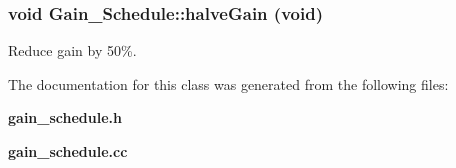 \subsubsection{\setlength{\rightskip}{0pt plus 5cm}void Gain\_\-Schedule::halve\-Gain (void)\hspace{0.3cm}{\tt  [inline]}}\label{classGain__Schedule_5fc79542643bd357116aea69735a1ac1}


Reduce gain by 50\%. 

The documentation for this class was generated from the following files:\begin{CompactItemize}
\item 
{\bf gain\_\-schedule.h}\item 
{\bf gain\_\-schedule.cc}\end{CompactItemize}
